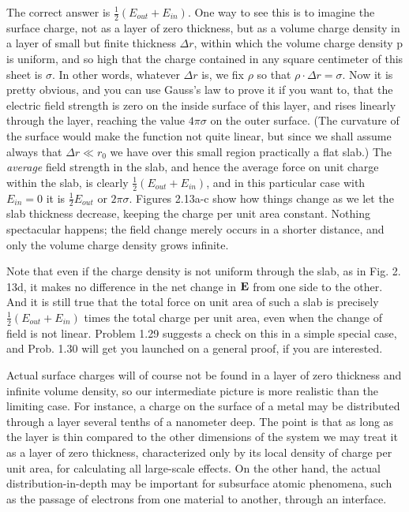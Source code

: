 The correct answer is $\frac{1}{2}(E_{out}+E_{in})$. One way to see this is to
imagine the surface charge, not as a layer of zero thickness, but as a
volume charge density in a layer of small but finite thickness $\Delta r$,
within which the volume charge density p is uniform, and so high that
the charge contained in any square centimeter of this sheet is $\sigma$. In
other words, whatever $\Delta r$ is, we fix $\rho$ so that $\rho\cdot\Delta r=\sigma$. Now it is
pretty obvious, and you can use Gauss's law to prove it if you want to,
that the electric field strength is zero on the inside surface of this
layer, and rises linearly through the layer, reaching the value $4\pi\sigma$ on
the outer surface. (The curvature of the surface would make the
function not quite linear, but since we shall assume always that
$\Delta r\ll r_0$ we have over this small region practically a flat slab.) The
\emph{average} field strength in the slab, and hence the average force on unit
charge within the slab, is clearly $\frac{1}{2}(E_{out}+E_{in})$, and in this particular
case with $E_{in}=0$ it is $\frac{1}{2}E_{out}$ or $2\pi\sigma$. Figures 2.13a-c show how things
change as we let the slab thickness decrease, keeping the charge per
unit area constant. Nothing spectacular happens; the field change
merely occurs in a shorter distance, and only the volume charge
density grows infinite.

Note that even if the charge density is not uniform through the slab,
as in Fig. 2. 13d, it makes no difference in the net change in $\mathbf{E}$ from one
side to the other. And it is still true that the total force on unit area
of such a slab is precisely $\frac{1}{2}(E_{out}+E_{in})$ times the total charge per unit
area, even when the change of field is not linear. Problem 1.29 suggests
a check on this in a simple special case, and Prob. 1.30 will get
you launched on a general proof, if you are interested.

Actual surface charges will of course not be found in a layer of zero
thickness and infinite volume density, so our intermediate picture is
more realistic than the limiting case. For instance, a charge on the
surface of a metal may be distributed through a layer several
tenths of a nanometer deep. The point is that as long as the layer is thin compared
to the other dimensions of the system we may treat it as a layer
of zero thickness, characterized only by its local density of charge
per unit area, for calculating all large-scale effects. On the other
hand, the actual distribution-in-depth may be important for subsurface
atomic phenomena, such as the passage of electrons from one
material to another, through an interface.

